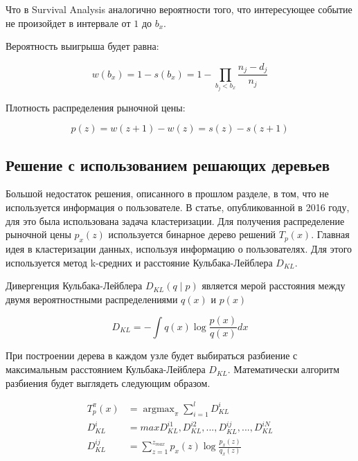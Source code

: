 \documentclass[times,specification,annotation]{itmo-student-thesis}
\DeclareMathOperator*{\argmax}{argmax}
\begin{document}
Что в Survival Analysis аналогично вероятности того, что интересующее событие не произойдет в интервале от $1$ до $b_x$.

Вероятность выигрыша будет равна:

\begin{equation}
    w(b_x) = 1 - s(b_x) = 1 - \prod_{b_j < b_x} \frac{n_j - d_j}{n_j}
\end{equation}

Плотность распределения рыночной цены:

\begin{equation}
    p(z)=w(z+1)-w(z)=s(z)-s(z+1)
\end{equation}

\subsection{Решение с использованием решающих деревьев}

Большой недостаток решения, описанного в прошлом разделе, в том, что не используется информация о пользователе. 
В статье, опубликованной в 2016 году, для это была использована задача кластеризации.
Для получения распределение рыночной цены $p_x (z)$ используется бинарное дерево решений $T_p (x)$. 
Главная идея в кластеризации данных, используя информацию о пользователях. 
Для этого используется метод k-средних и расстояние Кульбака-Лейблера $D_{KL}$.

Дивергенция Кульбака-Лейблера $D_{KL} (q \mid p)$ является мерой расстояния между двумя вероятностными распределениями $q(x)$ и $p(x)$

\begin{equation}
    D_{KL} = - \int q(x) \log \frac{p(x)}{q(x)} dx
\end{equation}

При построении дерева в каждом узле будет выбираться разбиение с максимальным расстоянием Кульбака-Лейблера $D_{KL}$. 
Математически алгоритм разбиения будет выглядеть следующим образом.

\begin{equation}
    \begin{split}
        T_p^{\pi} (x) & = \argmax_{\pi} \sum_{i = 1}^l D_{KL}^i \\
        D_{KL}^i & = max {D_{KL}^{i1}, D_{KL}^{i2}, ..., D_{KL}^{ij}, ..., D_{KL}^{iN}} \\
        D_{KL}^{ij} & = \sum_{z = 1}^{z_{max}} p_x(z) \log \frac{p_x(z)}{q_x(z)}
    \end{split}
\end{equation}
\end{document}
